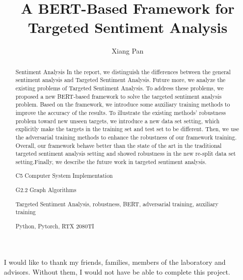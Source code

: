 \documentclass[fyp]{socreport}
\begin{document}
\title{A BERT-Based Framework for Targeted Sentiment Analysis}
\author{Xiang Pan}


\maketitle
\begin{abstract}
Sentiment Analysis 
In the report, we distinguish the differences between the general sentiment analysis and Targeted Sentiment Analysis. Future more, we analyze the existing problems of Targeted Sentiment Analysis. To address these problems, we proposed a new BERT-based framework to solve the targeted sentiment analysis problem. Based on the framework, we introduce some auxiliary training methods to improve the accuracy of the results. To illustrate the existing methods' robustness problem toward new unseen targets, we introduce a new data set setting, which explicitly make the targets in the training set and test set to be different. Then, we use the adversarial training methods to enhance the robustness of our framework training. Overall, our framework behave better than the state of the art in the traditional targeted sentiment analysis setting and showed robustness in the new re-split data set setting.Finally, we describe the future work in targeted sentiment analysis.


\begin{descriptors}
    \item C5 Computer System Implementation
	\item G2.2 Graph Algorithms
\end{descriptors}
\begin{keywords}
	Targeted Sentiment Analysis, robustness, BERT, adversarial training, auxiliary training
\end{keywords}
\begin{implement}
	Python, Pytorch, RTX 2080TI
\end{implement}
\end{abstract}

\begin{acknowledgement}
   I would like to thank my friends, families, members of the laboratory and advisors.
   Without them, I would not have be able to complete this project.
\end{acknowledgement}
\end{document}
